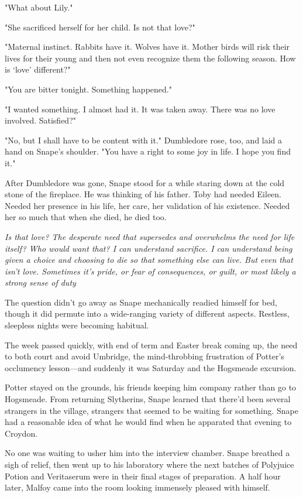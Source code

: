 "What about Lily."

"She sacrificed herself for her child. Is not that love?"

"Maternal instinct. Rabbits have it. Wolves have it. Mother birds will risk their lives for their young and then not even recognize them the following season. How is `love' different?"

"You are bitter tonight. Something happened."

"I wanted something. I almost had it. It was taken away. There was no love involved. Satisfied?"

"No, but I shall have to be content with it." Dumbledore rose, too, and laid a hand on Snape's shoulder. "You have a right to some joy in life. I hope you find it."

After Dumbledore was gone, Snape stood for a while staring down at the cold stone of the fireplace. He was thinking of his father. Toby had needed Eileen. Needed her presence in his life, her care, her validation of his existence. Needed her so much that when she died, he died too.

\emph{Is that love? The desperate need that supersedes and overwhelms the need for life itself? Who would want that? I can understand sacrifice. I can understand being given a choice and choosing to die so that something else can live. But even that isn't love. Sometimes it's pride, or fear of consequences, or guilt, or most likely a strong sense of duty{\el}}

The question didn't go away as Snape mechanically readied himself for bed, though it did permute into a wide-ranging variety of different aspects. Restless, sleepless nights were becoming habitual.

The week passed quickly, with end of term and Easter break coming up, the need to both court and avoid Umbridge, the mind-throbbing frustration of Potter's occlumency lesson—and suddenly it was Saturday and the Hogsmeade excursion.

Potter stayed on the grounds, his friends keeping him company rather than go to Hogsmeade. From returning Slytherins, Snape learned that there'd been several strangers in the village, strangers that seemed to be waiting for something. Snape had a reasonable idea of what he would find when he apparated that evening to Croydon.

No one was waiting to usher him into the interview chamber. Snape breathed a sigh of relief, then went up to his laboratory where the next batches of Polyjuice Potion and Veritaserum were in their final stages of preparation. A half hour later, Malfoy came into the room looking immensely pleased with himself.

